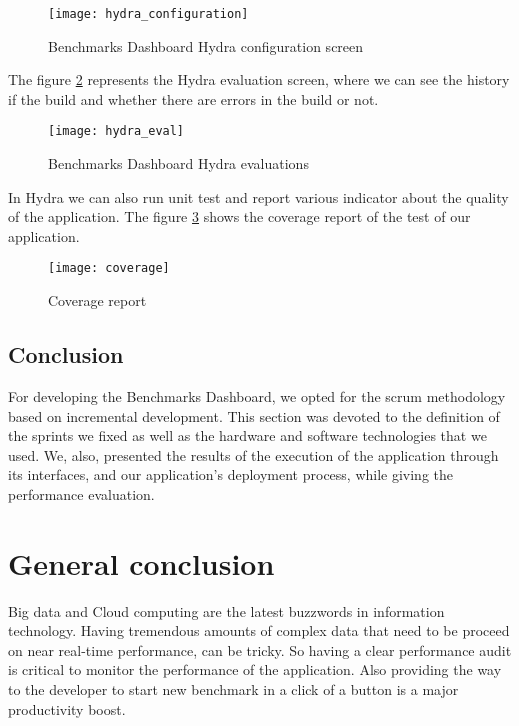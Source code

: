 \begin{figure}[h]
\texttt{[image: hydra\_configuration]}
\caption{Benchmarks Dashboard Hydra configuration screen}
\label{fig:hydra_configuration}
\end{figure}

The figure \hyperref[fig:hydra_eval]{\ref{fig:hydra_eval}} represents the Hydra
evaluation screen, where we can see the history if the build and whether there
are errors in the build or not.

\begin{figure}[h]
\texttt{[image: hydra\_eval]}
\caption{Benchmarks Dashboard Hydra evaluations}
\label{fig:hydra_eval}
\end{figure}

In Hydra we can also run unit test and report various indicator about the
quality of the application. The figure
\hyperref[fig:coverage]{\ref{fig:coverage}} shows the coverage report of the test
of our application.

\begin{figure}[h]
\texttt{[image: coverage]}
\caption{Coverage report}
\label{fig:coverage}
\end{figure}

\clearpage
\section*{Conclusion}
For developing the Benchmarks Dashboard, we opted for the scrum methodology
based on incremental development. This section was devoted to the definition of
the sprints we fixed as well as the hardware and software technologies that we
used. We, also, presented the results of the execution of the application
through its interfaces, and our application's deployment process, while giving
the performance evaluation.

\chapter*{General conclusion}

Big data and Cloud computing are the latest buzzwords in information technology.
Having tremendous amounts of complex data that need to be proceed on near
real-time performance, can be tricky. So having a clear performance audit is
critical to monitor the performance of the application. Also providing the way
to the developer to start new benchmark in a click of a button is a major
productivity boost.

